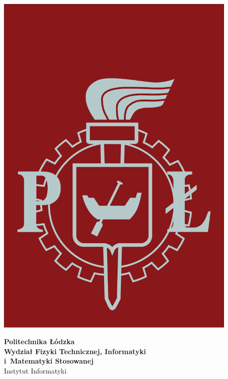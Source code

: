 \begin{titlepage}

\noindent
\begin{minipage}{0.19\textwidth}
\begin{flushleft}
\includegraphics[width=0.88\textwidth]{images/logo}
\end{flushleft}
\end{minipage}
\begin{minipage}[t][][t]{0.81\textwidth}
\begin{flushleft}
\vspace{-2\baselineskip}
\textbf{{\large Politechnika Łódzka}\\}
\vspace{\medskipamount}
\textbf{\large Wydział Fizyki Technicznej, Informatyki\\i~Matematyki Stosowanej}
\vspace{\medskipamount}\\
{\large Instytut Informatyki}\\
\end{flushleft}
\end{minipage}
\vspace{2.5cm}


\end{titlepage}
